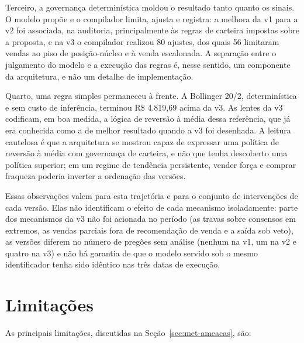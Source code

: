 \documentclass{eic-bcc-tcc}
\begin{document}
Terceiro, a governança determinística moldou o resultado tanto quanto os sinais. O modelo propõe e o compilador limita, ajusta e registra: a melhora da v1 para a v2 foi associada, na auditoria, principalmente às regras de carteira impostas sobre a proposta, e na v3 o compilador realizou 80 ajustes, dos quais 56 limitaram vendas ao piso de posição-núcleo e à venda escalonada. A separação entre o julgamento do modelo e a execução das regras é, nesse sentido, um componente da arquitetura, e não um detalhe de implementação.

Quarto, uma regra simples permaneceu à frente. A Bollinger 20/2, determinística e sem custo de inferência, terminou R\$ 4.819,69 acima da v3. As lentes da v3 codificam, em boa medida, a lógica de reversão à média dessa referência, que já era conhecida como a de melhor resultado quando a v3 foi desenhada. A leitura cautelosa é que a arquitetura se mostrou capaz de expressar uma política de reversão à média com governança de carteira, e não que tenha descoberto uma política superior; em um regime de tendência persistente, vender força e comprar fraqueza poderia inverter a ordenação das versões.

Essas observações valem para esta trajetória e para o conjunto de intervenções de cada versão. Elas não identificam o efeito de cada mecanismo isoladamente: parte dos mecanismos da v3 não foi acionada no período (as travas sobre consensos em extremos, as vendas parciais fora de recomendação de venda e a saída sob veto), as versões diferem no número de pregões sem análise (nenhum na v1, um na v2 e quatro na v3) e não há garantia de que o modelo servido sob o mesmo identificador tenha sido idêntico nas três datas de execução.

\section{Limitações}

As principais limitações, discutidas na Seção~\ref{sec:met-ameacas}, são:
\end{document}
